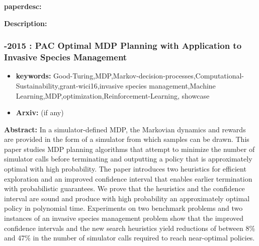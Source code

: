 \documentclass{article}
\begin{document}
\textbf{paperdesc:} 

\textbf{Description:} 



\newpage
\subsubsection{\textbf{-2015} : PAC Optimal MDP Planning with Application to Invasive Species Management}
\begin{itemize}
\item \textbf{keywords:} Good-Turing,MDP,Markov-decision-processes,Computational-Sustainability,grant-wici16,invasive species management,Machine Learning,MDP,optimization,Reinforcement-Learning, showcase
\item \textbf{Arxiv:}  (if any)
\end{itemize}


\textbf{Abstract:} In a simulator-defined MDP, the Markovian dynamics and rewards are provided in the form of a simulator from which samples can be drawn. This paper studies MDP planning algorithms that attempt to minimize the number of simulator calls before terminating and outputting a policy that is approximately optimal with high probability. The paper introduces two heuristics for efficient exploration and an improved confidence interval that enables earlier termination with probabilistic guarantees. We prove that the heuristics and the confidence interval are sound and produce with high probability an approximately optimal policy in polynomial time. Experiments on two benchmark problems and two instances of an invasive species management problem show that the improved confidence intervals and the new search heuristics yield reductions of between 8{\%} and 47{\%} in the number of simulator calls required to reach near-optimal policies.
\end{document}
